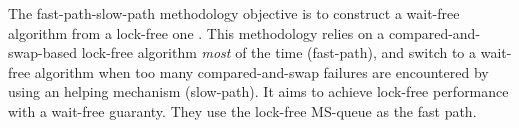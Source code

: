  The fast-path-slow-path methodology objective is to
construct a wait-free algorithm from a lock-free one
\cite{Kogan:2012:MCF:2370036.2145835}. This methodology relies on a
compared-and-swap-based lock-free algorithm \textit{most} of the time
(fast-path), and switch to a wait-free algorithm when too many compared-and-swap
failures are encountered by using an helping mechanism (slow-path). It aims to
achieve lock-free performance with a wait-free guaranty. They use the lock-free
MS-queue as the fast path.
